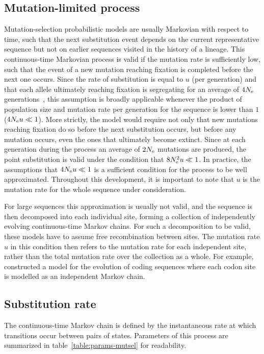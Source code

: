 \subsection{Mutation-limited process}
\label{subsec:mutation-limited-assumption}

Mutation-selection probabilistic models are usually Markovian with respect to time, such that the next substitution event depends on the current representative sequence but not on earlier sequences visited in the history of a lineage.
This continuous-time Markovian process is valid if the mutation rate is sufficiently low, such that the event of a new mutation reaching fixation is completed before the next one occurs.
Since the rate of substitution is equal to $u$ (per generation) and that each allele ultimately reaching fixation is segregating for an average of $4 N_{\text{e}}$ generations~\citep{Kimura1969}, this assumption is broadly applicable whenever the product of population size and mutation rate per generation for the sequence is lower than $1$ ($4 N_{\text{e}} u \ll 1$).
More strictly, the model would require not only that new mutations reaching fixation do so before the next substitution occurs, but before any mutation occurs, even the ones that ultimately become extinct.
Since at each generation during the process an average of $2N_{\text{e}}$ mutations are produced, the point substitution is valid under the condition that $8N_{\text{e}}^2 u \ll 1$.
In practice, the assumptions that $4 N_{\text{e}} u \ll 1$ is a sufficient condition for the process to be well approximated.
Throughout this development, it is important to note that $u$ is the mutation rate for the whole sequence under consideration.

For large sequences this approximation is usually not valid, and the sequence is then decomposed into each individual site, forming a collection of independently evolving continuous-time Markov chains.
For such a decomposition to be valid, these models have to assume free recombination between sites.
The mutation rate $u$ in this condition then refers to the mutation rate for each independent site, rather than the total mutation rate over the collection as a whole.
For example, \citet{Halpern1998} constructed a model for the evolution of coding sequences where each codon site is modelled as an independent Markov chain.


\subsection{Substitution rate}
The continuous-time Markov chain is defined by the instantaneous rate at which transitions occur between pairs of states.
Parameters of this process are summarized in table~\ref{table:params-mutsel} for readability.

